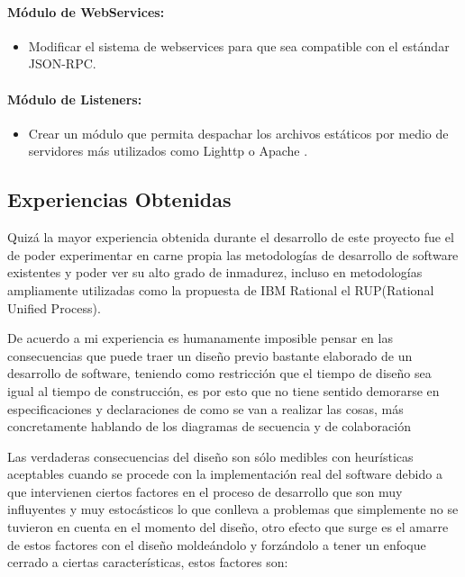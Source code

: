 \paragraph{Módulo de WebServices:}

\begin{itemize}
	\item Modificar el sistema de webservices para que sea compatible con el estándar JSON-RPC. \cite{json-rpc}
\end{itemize}

\paragraph{Módulo de Listeners:}

\begin{itemize}
	\item Crear un módulo que permita despachar los archivos estáticos por medio de servidores más utilizados como Lighttp \cite{lighttp} o Apache \cite{apache}.
\end{itemize}


\subsection{Experiencias Obtenidas}

Quizá la mayor experiencia obtenida durante el desarrollo de este proyecto fue el de poder experimentar en carne propia las metodologías de desarrollo de software existentes y poder ver su alto grado de inmadurez, incluso en metodologías ampliamente utilizadas como la propuesta de IBM Rational el RUP(Rational Unified Process).

De acuerdo a mi experiencia es humanamente imposible pensar en las consecuencias que puede traer un diseño previo bastante elaborado de un desarrollo de software, teniendo como restricción que el tiempo de diseño sea igual al tiempo de construcción, es por esto que no tiene sentido demorarse en especificaciones y declaraciones de como se van a realizar las cosas, más concretamente hablando de los diagramas de secuencia y de colaboración

Las verdaderas consecuencias del diseño son sólo medibles con heurísticas aceptables cuando se procede con la implementación real del software debido a que intervienen ciertos factores en el proceso de desarrollo que son muy influyentes y muy estocásticos lo que conlleva a problemas que simplemente no se tuvieron en cuenta en el momento del diseño, otro efecto que surge es el amarre de estos factores con el diseño moldeándolo y forzándolo a tener un enfoque cerrado a ciertas características, estos factores son:

